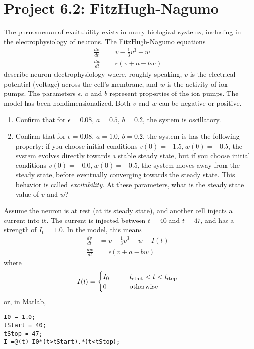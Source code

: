 \documentclass{exam}
\begin{document}
\section*{Project 6.2: FitzHugh-Nagumo}
 
 
 The phenomenon of excitability exists in many biological systems, including in the electrophysiology of neurons. The FitzHugh-Nagumo equations
 \begin{align}
 \frac{d v}{dt} &= v - \frac{1}{3} v^3 - w \\
 \frac{d w}{dt} &= \epsilon \left( v + a - bw\right)
 \end{align}
 describe neuron electrophysiology where, roughly speaking, $v$ is the electrical potential (voltage) across the cell's membrane, and $w$ is the activity of ion pumps. The parameters $\epsilon$, $a$ and $b$ represent properties of the ion pumps. The model has been nondimensionalized. Both $v$ and $w$ can be negative or positive.
 
 
\begin{enumerate}
\item Confirm that for $\epsilon=0.08$, $a=0.5$, $b=0.2$, the system is oscillatory.
\item Confirm that for $\epsilon=0.08$, $a=1.0$, $b=0.2$. the system is has the following property: if you choose initial conditions $v(0)=-1.5, w(0)=-0.5$, the system evolves directly towards a stable steady state, but if you choose initial conditions $v(0)=-0.0, w(0)=-0.5$, the system moves away from the steady state, before eventually converging towards the steady state. This behavior is called \textit{excitability}. At these parameters, what is the steady state value of $v$ and $w$?
\end{enumerate}

Assume the neuron is at rest (at its steady state), and another cell injects a current into it. The current is injected between $t=40$ and $t=47$, and has a strength of $I_0=1.0$. In the model, this means 
 \begin{align}
 \frac{d v}{dt} &= v - \frac{1}{3} v^3 - w +I(t)\\
 \frac{d w}{dt} &= \epsilon \left( v + a - bw\right) 
 \end{align}
 where 
 \begin{equation}
 I(t) = \begin{cases}
 I_0 & \qquad t_{\rm start}<t < t_{\rm stop}\\
 0 & \qquad \mbox{otherwise}
 \end{cases}
 \end{equation}
or, in Matlab,
\begin{lstlisting}
I0 = 1.0;
tStart = 40;
tStop = 47;
I =@(t) I0*(t>tStart).*(t<tStop);
\end{lstlisting}
\end{document}
